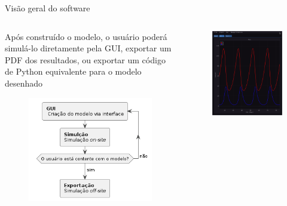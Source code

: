 \begin{frame}{Visão geral do software}
    \begin{columns}
        \begin{column}{.5\textwidth}
            Após construído o modelo, o usuário poderá simulá-lo diretamente pela GUI, exportar um PDF dos resultados, ou exportar um código de Python equivalente para o modelo desenhado
            \begin{figure}
                \includegraphics[width=.82\textwidth]{contents/imgs/fluxograma-exp.png}
            \end{figure}
        \end{column}
        \begin{column}{.5\textwidth}
            \begin{figure}
                \centering
                \includegraphics[width=.82\textwidth]{contents/imgs/ode-designer/grafico-thin.png}
            \end{figure}
        \end{column}
    \end{columns}
\end{frame}


